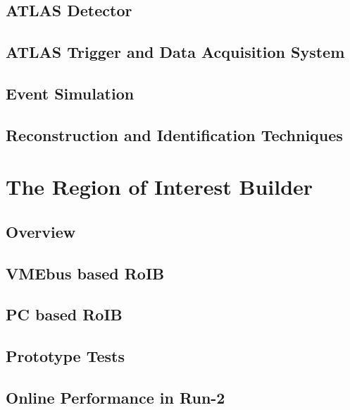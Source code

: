 \documentclass{outhesis}
\begin{document}
\section{ATLAS Detector}\label{sec:exp.det}

\section{ATLAS Trigger and Data Acquisition System}\label{sec:exp.tdaq}

\section{Event Simulation}\label{sec:exp.sim}

\section{Reconstruction and Identification Techniques}\label{sec:exp.reco}


\chapter{The Region of Interest Builder}\label{chap:roib}
\graphicspath{{figures/roib/}}
\section{Overview}\label{sec:roib.overview}

\section{VMEbus based RoIB}\label{sec:roib.overview}

\section{PC based RoIB}\label{sec:roib.pc}

\section{Prototype Tests}\label{sec:roib.proto}

\section{Online Performance in Run-2}\label{sec:roib.perf}

\end{document}
